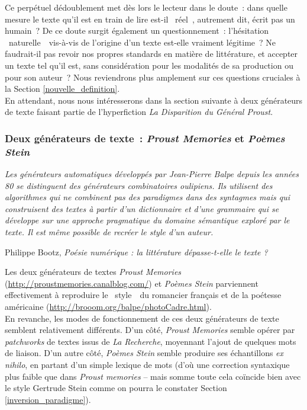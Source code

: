 \documentclass{article}
\newenvironment{citationbox}
{\begin{center}
		\begin{minipage}{.8\textwidth}
		}
		{
		\end{minipage}	
\end{center}
}
\begin{document}
					Ce perpétuel dédoublement met dès lors le lecteur dans le doute : dans quelle mesure le texte qu'il est en train de lire est-il \guillemotleft~réel~\guillemotright, autrement dit, écrit pas un humain ? De ce doute surgit également un questionnement : l'hésitation \guillemotleft~naturelle~\guillemotright~vis-à-vis de l'origine d'un texte est-elle vraiment légitime ? Ne faudrait-il pas revoir nos propres standards en matière de littérature, et accepter un texte tel qu'il est, sans considération pour les modalités de sa production ou pour son auteur ? Nous reviendrons plus amplement sur ces questions cruciales à la Section \ref{nouvelle_definition}.\\
					
					En attendant, nous nous intéresserons  dans la section suivante à deux générateurs de texte faisant partie de l'hyperfiction \textit{La Disparition du Général Proust}.
			
			\subsubsection{Deux générateurs de texte~: \textit{Proust Memories} et \textit{Poèmes Stein}}
				\begin{citationbox}
					\textit{Les générateurs automatiques développés par Jean-Pierre Balpe depuis les années 80
					se distinguent des générateurs combinatoires oulipiens. Ils utilisent des algorithmes qui ne
					combinent pas des paradigmes dans des syntagmes mais qui construisent des textes à partir
					d’un dictionnaire et d’une grammaire qui se développe sur une approche pragmatique du
					domaine sémantique exploré par le texte. Il est même possible de recréer le style d’un auteur. }
					\begin{flushright}
						Philippe Bootz, \textit{Poésie numérique : la littérature dépasse-t-elle le
						texte ?}\autocite{bootz2005}
					\end{flushright}
				\end{citationbox}
				Les deux générateurs de textes \textit{Proust Memories} (\href{http://proustmemories.canalblog.com/}{http://proustmemories.canalblog.com/}) et \textit{Poèmes Stein} parviennent effectivement à reproduire le \guillemotleft~style~\guillemotright~du romancier français et de la poétesse américaine (\href{http://brooom.org/balpe/photoCadre.html}{http://brooom.org/balpe/photoCadre.html}).\\ 
				
				En revanche, les modes de fonctionnement de ces deux générateurs de texte semblent relativement différents. D'un côté, \textit{Proust Memories} semble opérer par \textit{patchworks} de textes issus de \textit{La Recherche}, moyennant l'ajout de quelques mots de liaison. D'un autre côté, \textit{Poèmes Stein} semble produire ses échantillons \textit{ex nihilo}, en partant d'un simple lexique de mots (d'où une correction syntaxique plus faible que dans \textit{Proust memories} -- mais somme toute cela coïncide bien avec le style Gertrude Stein comme on pourra le constater Section \ref{inversion_paradigme}). 
				
\end{document}
